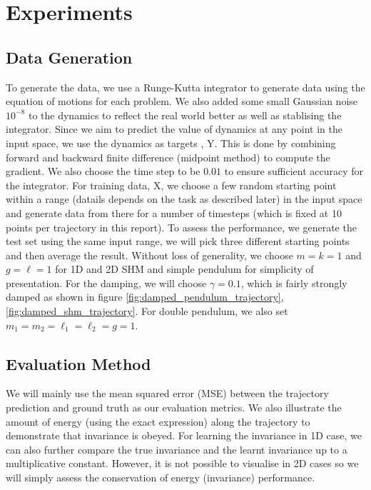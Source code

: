 \documentclass{statsmsc}
\begin{document}
\chapter{Experiments}
\section{Data Generation}
To generate the data, we use a Runge-Kutta integrator to generate data using the equation of motions for each problem. 
We also added some small Gaussian noise $10^{-8}$ to the dynamics to reflect the real world better as well as stablising the integrator.
Since we aim to predict the value of dynamics at any point in the input space, we use the dynamics as targets , Y. 
This is done by combining forward and backward finite difference (midpoint method) to compute the gradient. 
We also choose the time step to be $0.01$ to ensure sufficient accuracy for the integrator.
For training data, X, we choose a few random starting point within a range (datails depends on the task as described later) in the input space and generate data from there for a number of timesteps (which is fixed at 10 points per trajectory in this report). 
To assess the performance, we generate the test set using the same input range, we will pick three different starting points and then average the result.
Without loss of generality, we choose $m=k=1$ and $g=\ell=1$ for 1D and 2D SHM and simple pendulum for simplicity of presentation. 
For the damping, we will choose $\gamma= 0.1$, which is fairly strongly damped as shown in figure \ref{fig:damped_pendulum_trajectory}, \ref{fig:damped_shm_trajectory}. 
For double pendulum, we also set $m_1=m_2=\ell_1=\ell_2=g=1.$

\section{Evaluation Method}
We will mainly use the mean squared error (MSE) between the trajectory prediction and ground truth as our evaluation metrics. 
We also illustrate the amount of energy (using the exact expression) along the trajectory to demonstrate that invariance is obeyed.
For learning the invariance in 1D case, we can also further compare the true invariance and the learnt invariance up to a multiplicative constant.
However, it is not possible to visualise in 2D cases so we will simply assess the conservation of energy (invariance) performance.
\end{document}
